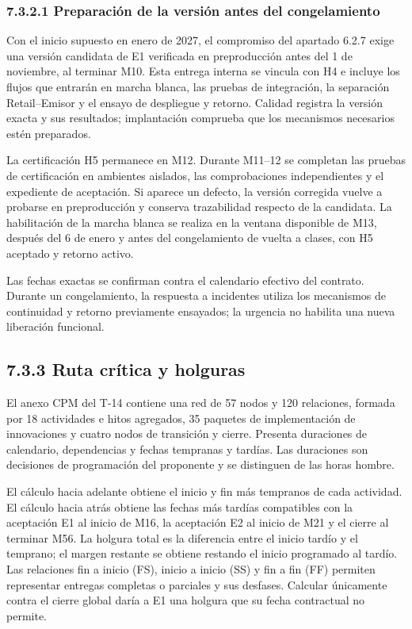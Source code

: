 \documentclass[11pt]{article}
\begin{document}
\subsubsection{7.3.2.1 Preparación de la versión antes del congelamiento}

Con el inicio supuesto en enero de 2027, el compromiso del apartado 6.2.7 exige una versión candidata de E1 verificada en preproducción antes del 1 de noviembre, al terminar M10. Esta entrega interna se vincula con H4 e incluye los flujos que entrarán en marcha blanca, las pruebas de integración, la separación Retail--Emisor y el ensayo de despliegue y retorno. Calidad registra la versión exacta y sus resultados; implantación comprueba que los mecanismos necesarios estén preparados.

La certificación H5 permanece en M12. Durante M11--12 se completan las pruebas de certificación en ambientes aislados, las comprobaciones independientes y el expediente de aceptación. Si aparece un defecto, la versión corregida vuelve a probarse en preproducción y conserva trazabilidad respecto de la candidata. La habilitación de la marcha blanca se realiza en la ventana disponible de M13, después del 6 de enero y antes del congelamiento de vuelta a clases, con H5 aceptado y retorno activo.

Las fechas exactas se confirman contra el calendario efectivo del contrato. Durante un congelamiento, la respuesta a incidentes utiliza los mecanismos de continuidad y retorno previamente ensayados; la urgencia no habilita una nueva liberación funcional.

\subsection{7.3.3 Ruta crítica y holguras}

El anexo CPM del T-14 contiene una red de 57 nodos y 120 relaciones, formada por 18 actividades e hitos agregados, 35 paquetes de implementación de innovaciones y cuatro nodos de transición y cierre. Presenta duraciones de calendario, dependencias y fechas tempranas y tardías. Las duraciones son decisiones de programación del proponente y se distinguen de las horas hombre.

El cálculo hacia adelante obtiene el inicio y fin más tempranos de cada actividad. El cálculo hacia atrás obtiene las fechas más tardías compatibles con la aceptación E1 al inicio de M16, la aceptación E2 al inicio de M21 y el cierre al terminar M56. La holgura total es la diferencia entre el inicio tardío y el temprano; el margen restante se obtiene restando el inicio programado al tardío. Las relaciones fin a inicio (FS), inicio a inicio (SS) y fin a fin (FF) permiten representar entregas completas o parciales y sus desfases. Calcular únicamente contra el cierre global daría a E1 una holgura que su fecha contractual no permite.
\end{document}
